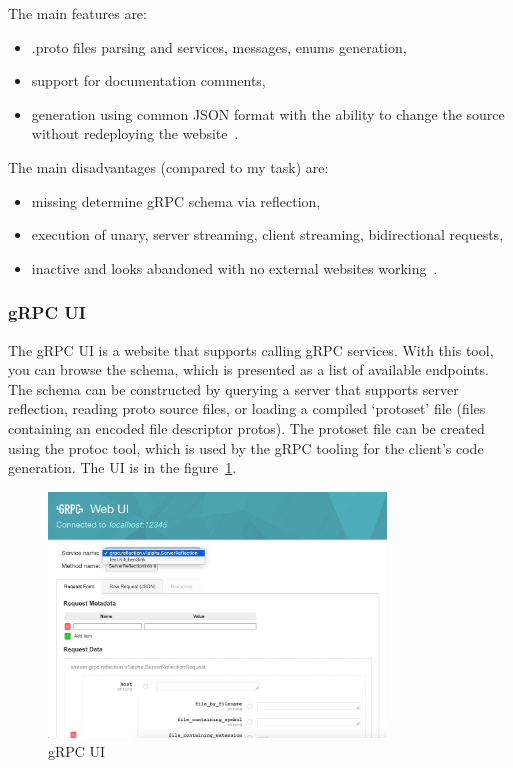The main features are:
\begin{itemize}
    \item .proto files parsing and services, messages, enums generation,
    \item support for documentation comments,
    \item generation using common JSON format with the ability to change the source without redeploying the website~\cite{grpc-gendocu}.
\end{itemize}

The main disadvantages (compared to my task) are:
\begin{itemize}
    \item missing determine gRPC schema via reflection,
    \item execution of unary, server streaming, client streaming, bidirectional requests,
    \item inactive and looks abandoned with no external websites working~\cite{grpc-gendocu}.
\end{itemize}

\subsubsection{gRPC UI}
The gRPC UI is a website that supports calling gRPC services.
With this tool, you can browse the schema, which is presented as a list of available endpoints.
The schema can be constructed by querying a server that supports server reflection, reading proto source files, or loading a compiled `protoset' file (files containing an encoded file descriptor protos).
The protoset file can be created using the protoc tool, which is used by the gRPC tooling for the client's code generation.
The UI is in the figure~\ref{fig:grpc-grpcui}.
\cite{grpc-grpcui}

\begin{figure}[hbt!]
    \centering
    \captionsetup{justification=centering}
    \includegraphics[width=0.8\textwidth]{images/grpc/grpcui}
    \caption{gRPC UI~\cite{grpc-grpcui}}
    \label{fig:grpc-grpcui}
\end{figure}

